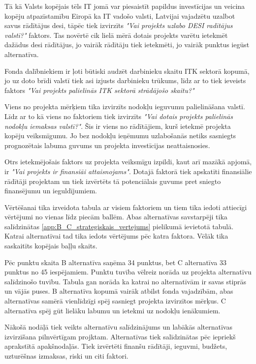\par
Tā kā Valsts kopējais tēls IT jomā var piesaistīt papildus investīcijas un veicina kopēju atpazīstamību 
Eiropā ka IT vadošo valsti, Latvijai vajadzētu uzalbot savus rādītājus \acrshort{desi}, tāpēc tiek izvirzīts 
\textit{"Vai projekts uzlabo DESI radītājus valstī?"} faktors. Tas novērtē cik lielā mērā dotais projekts varētu
ietekmēt dažādus \acrshort{desi} rādītājus, jo vairāk rādītāju tiek ietekmēti, jo vairāk punktus iegūst
alternatīva.
\par
Fonda dalībniekiem ir ļoti būtiski audzēt darbinieku skaitu ITK sektorā kopumā, jo uz doto brīdi valstī
tiek asi izjusts darbinieku trūkums, līdz ar to tiek ieveists faktors 
\textit{"Vai projekts palielinās ITK sektorā strādājošo skaitu?"}
\par
Viens no projekta mērķiem tika izvirzīts nodokļu ieguvumu palielināšana valstī. Līdz ar to kā viens no faktoriem
tiek izvirzīts \textit{"Vai dotais projekts palielinās nodokļu iemaksas valstī?"}. Šis ir viens no rādītājiem,
kurš ietekmē projekta kopēju veiksmīgumu. Jo bez nodokļu ieņēmumu uzlabošanās netiks sasniegts prognozētais
labuma guvums un projekta investīcijas neattaisnosies.
\par
Otrs ietekmējošais faktors uz projekta veiksmīgu izpildi, kaut arī mazākā apjomā, ir \textit{"Vai projekts ir
finansiāi attaisnojams"}. Dotajā faktorā tiek apskatīti finansiālie rādītāji projektam un tiek izvērtēts
tā potenciālais guvums pret sniegto finansējumu un ieguldījumiem.	
\par
Vērtēšanai tika izveidota tabula ar visiem faktoriem un tiem tika iedoti attiecīgi vērtējumi no vienas līdz
piecām ballēm. Abas alternatīvas savstarpēji tika salīdzinātas \ref{app:B_C_strategiskais_vertejums} pielikumā
ievietotā tabulā. Katrai alternatīvai tad tika iedots vērtējums pēc katra faktora. Vēlāk tika saskaitīts kopējais
baļļu skaits.
\par
Pēc punktu skaita B alternatīva saņēma 34 punktus, bet C alternatīva 33 punktus no 45 iespējamiem.
Punktu tuvība vēlreiz norāda uz projekta alternatīvu salīdzinošo tuvību. Tabula gan norāda ka katrai no alternatīvām
ir savas stiprās un vājās puses. B alternatīva kopumā vairāk atbilst fonda vajadzībām, abas alternatīvas 
samērā vienlīdzīgi spēj sasniegt projekta izvirzītos mērķus. C alternatīva spēj gūt lielāku labumu un ietekmi 
uz nodokļu ienākumiem. 
\par
Nākošā nodāļā tiek veikts alternatīvu salīdzinājums un labākās alternatīvas izvirzīšana pilnvērtīgam
projktam. Alternatīvas tiek salīdzinātas pēc iepriekš aprakstītā apakšnodaļās. Tiek izvērtēti finanšu
rādītāji, ieguvmi, budžets, uzturēšnas izmaksas, riski un citi faktori.
